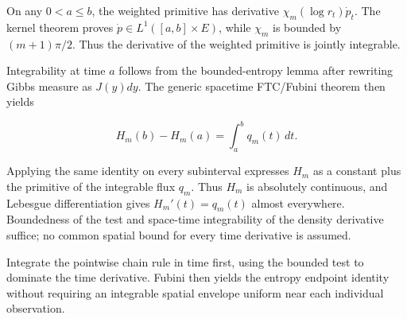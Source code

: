 \documentclass[11pt,a4paper]{article}
\begin{document}
On any \(0<a\le b\), the weighted primitive has derivative \(\chi_m(\log r_t)\dot p_t\). The kernel theorem proves \(\dot p\in L^1([a,b]\times E)\), while \(\chi_m\) is bounded by \((m+1)\pi/2\). Thus the derivative of the weighted primitive is jointly integrable.



Integrability at time \(a\) follows from the bounded-entropy lemma after rewriting Gibbs measure as \(J(y)dy\). The generic spacetime FTC/\allowbreak{}Fubini theorem then yields

\[H_m(b)-H_m(a)=\int_a^b q_m(t)\,dt.\]

Applying the same identity on every subinterval expresses \(H_m\) as a constant plus the primitive of the integrable flux \(q_m\). Thus \(H_m\) is absolutely continuous, and Lebesgue differentiation gives \(H_m'(t)=q_m(t)\) almost everywhere. Boundedness of the test and space-time integrability of the density derivative suffice; no common spatial bound for every time derivative is assumed.



Integrate the pointwise chain rule in time first, using the bounded test to dominate the time derivative. Fubini then yields the entropy endpoint identity without requiring an integrable spatial envelope uniform near each individual observation.
\end{document}
